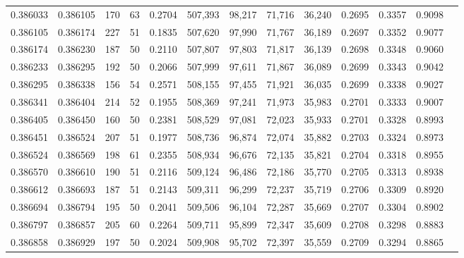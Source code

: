 \begin{tabular}{rrrrrrrrrrrrr}
0.386033 & 0.386105 &   170 &  63 &                                     0.2704 & 507,393 &  98,217 &  71,716 &  36,240 & 0.2695 & 0.3357 & 0.9098 \\
0.386105 & 0.386174 &   227 &  51 &                                     0.1835 & 507,620 &  97,990 &  71,767 &  36,189 & 0.2697 & 0.3352 & 0.9077 \\
0.386174 & 0.386230 &   187 &  50 &                                     0.2110 & 507,807 &  97,803 &  71,817 &  36,139 & 0.2698 & 0.3348 & 0.9060 \\
0.386233 & 0.386295 &   192 &  50 &                                     0.2066 & 507,999 &  97,611 &  71,867 &  36,089 & 0.2699 & 0.3343 & 0.9042 \\
0.386295 & 0.386338 &   156 &  54 &                                     0.2571 & 508,155 &  97,455 &  71,921 &  36,035 & 0.2699 & 0.3338 & 0.9027 \\
0.386341 & 0.386404 &   214 &  52 &                                     0.1955 & 508,369 &  97,241 &  71,973 &  35,983 & 0.2701 & 0.3333 & 0.9007 \\
0.386405 & 0.386450 &   160 &  50 &                                     0.2381 & 508,529 &  97,081 &  72,023 &  35,933 & 0.2701 & 0.3328 & 0.8993 \\
0.386451 & 0.386524 &   207 &  51 &                                     0.1977 & 508,736 &  96,874 &  72,074 &  35,882 & 0.2703 & 0.3324 & 0.8973 \\
0.386524 & 0.386569 &   198 &  61 &                                     0.2355 & 508,934 &  96,676 &  72,135 &  35,821 & 0.2704 & 0.3318 & 0.8955 \\
0.386570 & 0.386610 &   190 &  51 &                                     0.2116 & 509,124 &  96,486 &  72,186 &  35,770 & 0.2705 & 0.3313 & 0.8938 \\
0.386612 & 0.386693 &   187 &  51 &                                     0.2143 & 509,311 &  96,299 &  72,237 &  35,719 & 0.2706 & 0.3309 & 0.8920 \\
0.386694 & 0.386794 &   195 &  50 &                                     0.2041 & 509,506 &  96,104 &  72,287 &  35,669 & 0.2707 & 0.3304 & 0.8902 \\
0.386797 & 0.386857 &   205 &  60 &                                     0.2264 & 509,711 &  95,899 &  72,347 &  35,609 & 0.2708 & 0.3298 & 0.8883 \\
0.386858 & 0.386929 &   197 &  50 &                                     0.2024 & 509,908 &  95,702 &  72,397 &  35,559 & 0.2709 & 0.3294 & 0.8865 \\

\end{tabular}
